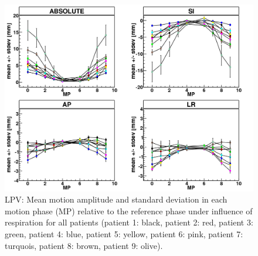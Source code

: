 
\newpage

\begin{figure}[H]
\begin{center}
 \includegraphics[scale=0.22]{./teile/results_mdacc/MDACC_allPatients_RESP_LPV.png}
\caption{LPV: Mean motion amplitude and standard deviation in each motion phase (MP) relative to the reference phase under influence of 
respiration for all patients (patient 1: black, patient 2: red, patient 3: green, patient 4: blue, patient 5: yellow, patient 6: pink, patient 
7: turquois, patient 8: brown, patient 9: olive). }
\label{motion_resp_all_lpv}
\end{center}
\end{figure}

\vspace*{-1cm}

